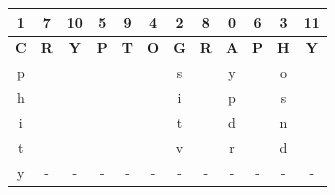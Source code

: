\documentclass{ashoka-crypto}
\begin{document}
\begin{center}
\begin{tabular}{|c|c|c|c|c|c|c|c|c|c|c|c|}
\hline
1          & 7          & 10         & 5          & 9          & 4          & 2          & 8          & 0          & 6          & 3          & 11         \\ \hline
\textbf{C} & \textbf{R} & \textbf{Y} & \textbf{P} & \textbf{T} & \textbf{O} & \textbf{G} & \textbf{R} & \textbf{A} & \textbf{P} & \textbf{H} & \textbf{Y} \\ \hline
p          &            &            &            &            &            & s          &            & y          &            & o          &            \\ \hline
h          &            &            &            &            &            & i          &            & p          &            & s          &            \\ \hline
i          &            &            &            &            &            & t          &            & d          &            & n          &            \\ \hline
t          &            &            &            &            &            & v          &            & r          &            & d          &            \\ \hline
y          &     -       &    -        &      -     &     -       &      -      &     -       &     -       &      -      &     -       &       -     &  -            \\ \hline
\end{tabular}
\end{center}
\end{document}
